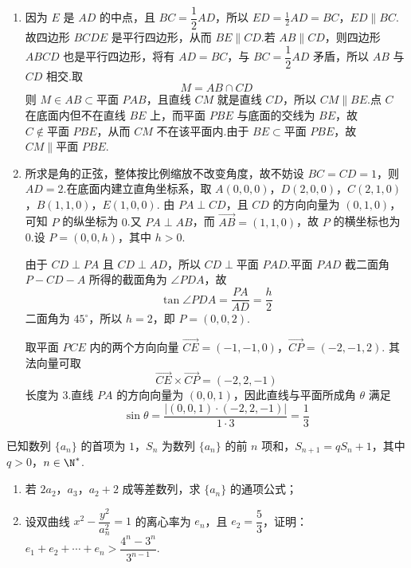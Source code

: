 \begin{solution}
\begin{enumerate}
\item 因为 \(E\) 是 \(AD\) 的中点，且 \(BC=\dfrac12AD\)，所以
\(ED=\frac12AD=BC\)，\(ED\parallel BC\).
故四边形 \(BCDE\) 是平行四边形，从而 \(BE\parallel CD\).若 \(AB\parallel CD\)，则四边形 \(ABCD\) 也是平行四边形，将有 \(AD=BC\)，与 \(BC=\dfrac12AD\) 矛盾，所以 \(AB\) 与 \(CD\) 相交.取
\[
M=AB\cap CD
\]
则 \(M\in AB\subset\text{平面 }PAB\)，且直线 \(CM\) 就是直线 \(CD\)，所以 \(CM\parallel BE\).点 \(C\) 在底面内但不在直线 \(BE\) 上，而平面 \(PBE\) 与底面的交线为 \(BE\)，故 \(C\notin\text{平面 }PBE\)，从而 \(CM\) 不在该平面内.由于 \(BE\subset\text{平面 }PBE\)，故 \(CM\parallel\text{平面 }PBE\).

\item 所求是角的正弦，整体按比例缩放不改变角度，故不妨设 \(BC=CD=1\)，则 \(AD=2\).在底面内建立直角坐标系，取
\(A(0,0,0)\)，\(D(2,0,0)\)，\(C(2,1,0)\)，\(B(1,1,0)\)，\(E(1,0,0)\).
由 \(PA\perp CD\)，且 \(CD\) 的方向向量为 \((0,1,0)\)，可知 \(P\) 的纵坐标为 \(0\).又 \(PA\perp AB\)，而 \(\overrightarrow{AB}=(1,1,0)\)，故 \(P\) 的横坐标也为 \(0\).设 \(P=(0,0,h)\)，其中 \(h>0\).

由于 \(CD\perp PA\) 且 \(CD\perp AD\)，所以 \(CD\perp\text{平面 }PAD\).平面 \(PAD\) 截二面角 \(P-CD-A\) 所得的截面角为 \(\angle PDA\)，故
\[
\tan\angle PDA=\frac{PA}{AD}=\frac h2
\]
二面角为 \(45^\circ\)，所以 \(h=2\)，即 \(P=(0,0,2)\).

取平面 \(PCE\) 内的两个方向向量
\(\overrightarrow{CE}=(-1,-1,0)\)，\(\overrightarrow{CP}=(-2,-1,2)\).
其法向量可取
\[
\overrightarrow{CE}\times\overrightarrow{CP}=(-2,2,-1)
\]
长度为 \(3\).直线 \(PA\) 的方向向量为 \((0,0,1)\)，因此直线与平面所成角 \(\theta\) 满足
\[
\sin\theta
=\frac{|(0,0,1)\cdot(-2,2,-1)|}{1\cdot3}
=\frac13
\]
\end{enumerate}
\end{solution}


\begin{problem}
已知数列 \(\{a_n\}\) 的首项为 \(1\)，\(S_n\) 为数列 \(\{a_n\}\) 的前 \(n\) 项和，\(S_{n+1}=qS_n+1\)，其中 \(q>0\)，\(n\in\N^*\).

\begin{enumerate}
\item 若 \(2a_2\)，\(a_3\)，\(a_2+2\) 成等差数列，求 \(\{a_n\}\) 的通项公式；
\item 设双曲线 \(x^2-\dfrac{y^2}{a_n^2}=1\) 的离心率为 \(e_n\)，且 \(e_2=\dfrac53\)，证明：\(e_1+e_2+\cdots+e_n>\dfrac{4^n-3^n}{3^{n-1}}\).
\end{enumerate}
\end{problem}

